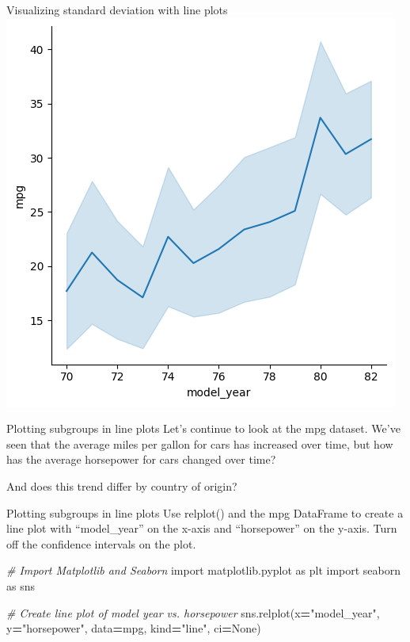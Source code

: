 \documentclass[
  ignorenonframetext,
]{beamer}
\newenvironment{Shaded}{\begin{snugshade}}{\end{snugshade}}
\newcommand{\CommentTok}[1]{\textcolor[rgb]{0.56,0.35,0.01}{\textit{#1}}}
\newcommand{\ImportTok}[1]{#1}
\newcommand{\NormalTok}[1]{#1}
\newcommand{\OperatorTok}[1]{\textcolor[rgb]{0.81,0.36,0.00}{\textbf{#1}}}
\newcommand{\StringTok}[1]{\textcolor[rgb]{0.31,0.60,0.02}{#1}}
\newcommand{\VariableTok}[1]{\textcolor[rgb]{0.00,0.00,0.00}{#1}}
\begin{document}
\begin{frame}{Visualizing standard deviation with line plots}
\label{visualizing-standard-deviation-with-line-plots-2}
\includegraphics{../images/im272.png}
\end{frame}

\begin{frame}{Plotting subgroups in line plots}
\label{plotting-subgroups-in-line-plots}
Let's continue to look at the mpg dataset. We've seen that the average
miles per gallon for cars has increased over time, but how has the
average horsepower for cars changed over time?

And does this trend differ by country of origin?
\end{frame}

\begin{frame}[fragile]{Plotting subgroups in line plots}
\label{plotting-subgroups-in-line-plots-1}
Use relplot() and the mpg DataFrame to create a line plot with
``model\_year'' on the x-axis and ``horsepower'' on the y-axis. Turn off
the confidence intervals on the plot.


\begin{Shaded}
\begin{Highlighting}[]
\CommentTok{\# Import Matplotlib and Seaborn}
\ImportTok{import}\NormalTok{ matplotlib.pyplot }\ImportTok{as}\NormalTok{ plt}
\ImportTok{import}\NormalTok{ seaborn }\ImportTok{as}\NormalTok{ sns}

\CommentTok{\# Create line plot of model year vs. horsepower}
\NormalTok{sns.relplot(x}\OperatorTok{=}\StringTok{"model\_year"}\NormalTok{, y}\OperatorTok{=}\StringTok{"horsepower"}\NormalTok{, }
\NormalTok{            data}\OperatorTok{=}\NormalTok{mpg, kind}\OperatorTok{=}\StringTok{"line"}\NormalTok{, }
\NormalTok{            ci}\OperatorTok{=}\VariableTok{None}\NormalTok{)}
\end{Highlighting}
\end{Shaded}
\end{frame}
\end{document}
